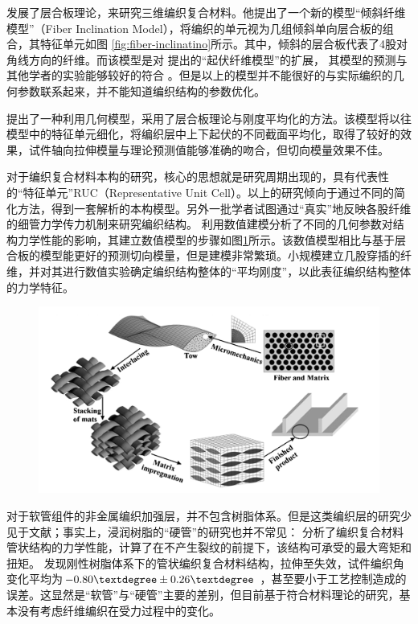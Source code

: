 \citeauthor{yang_fiber_1986}\cite{yang_fiber_1986}发展了层合板理论，来研究三维编织复合材料。他提出了一个新的模型“倾斜纤维模型”（Fiber Inclination Model），将编织的单元视为几组倾斜单向层合板的组合，其特征单元如图		\ref{fig:fiber-inclinatino}所示。其中，倾斜的层合板代表了4股对角线方向的纤维。而该模型是对
\citeauthor{chou_one-dimensional_1983}提出的“起伏纤维模型”\cite{chou_one-dimensional_1983}的扩展，
其模型的预测与其他学者的实验能够较好的符合
\cite{florentine_magnaweave_1984,macander_fabrication_1986,gause_mechanical_1983}。但是以上的模型并不能很好的与实际编织的几何参数联系起来，并不能知道编织结构的参数优化。

\citeauthor{byun_analytical_1991}\cite{byun_analytical_1991}提出了一种利用几何模型，采用了层合板理论与刚度平均化的方法。该模型将以往模型中的特征单元细化，将编织层中上下起伏的不同截面平均化，取得了较好的效果，试件轴向拉伸模量与理论预测值能够准确的吻合，但切向模量效果不佳。


对于编织复合材料本构的研究，核心的思想就是研究周期出现的，具有代表性的“特征单元”RUC（Representative Unit Cell）。以上的研究倾向于通过不同的简化方法，得到一套解析的本构模型。另外一批学者试图通过“真实”地反映各股纤维的细管力学传力机制来研究编织结构。
\citeauthor{Goyal2005}\cite{Goyal2005}利用数值建模分析了不同的几何参数对结构力学性能的影响，其建立数值模型的步骤如图\ref{fig:Goyal}所示。该数值模型相比\citeauthor{byun_analytical_1991}与\citeauthor{chou_one-dimensional_1983}基于层合板的模型能更好的预测切向模量，但是建模非常繁琐。\citeauthor{Cho2013}\cite{Cho2013}小规模建立几股穿插的纤维，并对其进行数值实验确定编织结构整体的“平均刚度”，以此表征编织结构整体的力学特征。

\begin{figure}
\centering
\includegraphics[height=0.25\textheight]{figure/chap1/Goyal}
\label{fig:Goyal}
\end{figure}
对于软管组件的非金属编织加强层，并不包含树脂体系。但是这类编织层的研究少见于文献；事实上，浸润树脂的“硬管”的研究也并不常见：
\citeauthor{Nakai1995}\cite{Nakai1995}分析了编织复合材料管状结构的力学性能，计算了在不产生裂纹的前提下，该结构可承受的最大弯矩和扭矩。
\citeauthor{Leung2013}\cite{Leung2013}发现刚性树脂体系下的管状编织复合材料结构，拉伸至失效，试件编织角变化平均为$ -0.80\textdegree \pm 0.26 \textdegree $ ，甚至要小于工艺控制造成的误差。这显然是“软管”与“硬管”主要的差别，但目前基于符合材料理论的研究，基本没有考虑纤维编织在受力过程中的变化。

